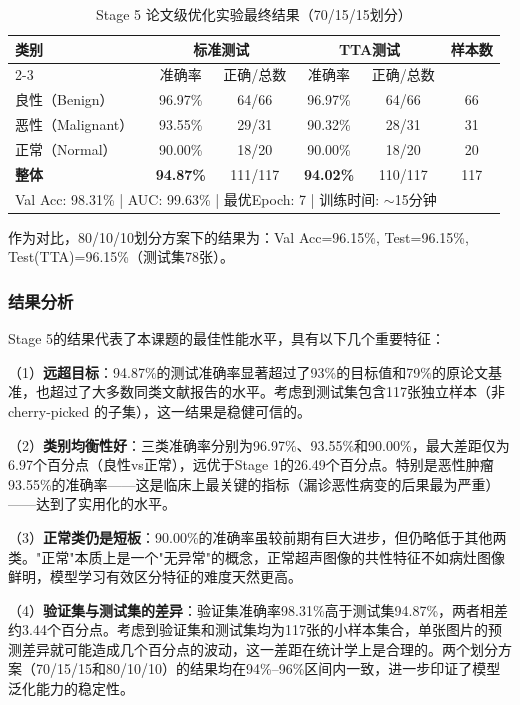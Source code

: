 \begin{table}[htb]
    \centering
    \caption{Stage 5 论文级优化实验最终结果（70/15/15划分）}
    \label{tbl:stage5_results}
    \begin{tabular}{lccccc}
        \toprule
        \multirow{2}{*}{类别} & \multicolumn{2}{c}{标准测试} & \multicolumn{2}{c}{TTA测试} & \multirow{2}{*}{样本数} \\
        \cline{2-3} \cline{4-5}
        & 准确率 & 正确/总数 & 准确率 & 正确/总数 & \\
        \midrule
        良性（Benign）    & 96.97\% & 64/66 & 96.97\% & 64/66 & 66 \\
        恶性（Malignant） & 93.55\% & 29/31 & 90.32\% & 28/31 & 31 \\
        正常（Normal）   & 90.00\% & 18/20 & 90.00\% & 18/20 & 20 \\
        \midrule
        \textbf{整体}    & \textbf{94.87\%} & 111/117 & \textbf{94.02\%} & 110/117 & 117 \\
        \multicolumn{5}{l}{Val Acc: 98.31\% | AUC: 99.63\% | 最优Epoch: 7 | 训练时间: $\sim$15分钟} \\
        \bottomrule
    \end{tabular}
\end{table}

作为对比，80/10/10划分方案下的结果为：Val Acc=96.15\%, Test=96.15\%, Test(TTA)=96.15\%（测试集78张）。

\subsubsection{结果分析}

Stage 5的结果代表了本课题的最佳性能水平，具有以下几个重要特征：

（1）\textbf{远超目标}：94.87\%的测试准确率显著超过了93\%的目标值和79\%的原论文基准，也超过了大多数同类文献报告的水平。考虑到测试集包含117张独立样本（非 cherry-picked 的子集），这一结果是稳健可信的。

（2）\textbf{类别均衡性好}：三类准确率分别为96.97\%、93.55\%和90.00\%，最大差距仅为6.97个百分点（良性vs正常），远优于Stage 1的26.49个百分点。特别是恶性肿瘤93.55\%的准确率——这是临床上最关键的指标（漏诊恶性病变的后果最为严重）——达到了实用化的水平。

（3）\textbf{正常类仍是短板}：90.00\%的准确率虽较前期有巨大进步，但仍略低于其他两类。"正常"本质上是一个"无异常"的概念，正常超声图像的共性特征不如病灶图像鲜明，模型学习有效区分特征的难度天然更高。

（4）\textbf{验证集与测试集的差异}：验证集准确率98.31\%高于测试集94.87\%，两者相差约3.44个百分点。考虑到验证集和测试集均为117张的小样本集合，单张图片的预测差异就可能造成几个百分点的波动，这一差距在统计学上是合理的。两个划分方案（70/15/15和80/10/10）的结果均在94\%--96\%区间内一致，进一步印证了模型泛化能力的稳定性。

